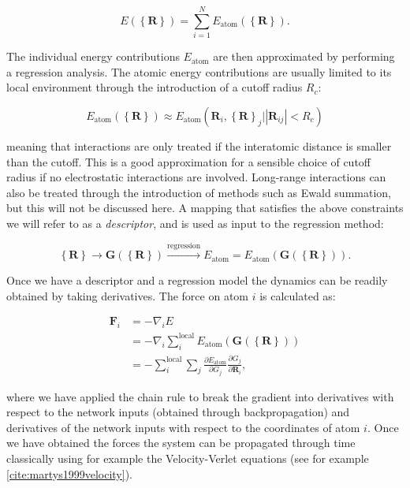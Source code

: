 \begin{equation}
 E(\left\{\bm{R}\right\}) = \sum_{i=1}^N E_{\text{atom}}
 (\left\{\bm{R}\right\}) . 
\end{equation}

The individual energy contributions $E_{\text{atom}}$
are then approximated by performing a regression analysis.
The atomic energy contributions are usually limited to its
local environment through the introduction of a cutoff radius $R_c$:

\begin{equation}
 E_{\text{atom}} (\left\{\bm{R}\right\}) \approx
    E_{\text{atom}} (\bm{R}_i, \left\{\bm{R}\right\}_j 
    | \left| \bm{R}_{ij} \right|
    < R_c) 
\end{equation}

meaning that interactions are only treated if the interatomic distance
is smaller than the cutoff. This is a good approximation for a sensible
choice of cutoff radius if no electrostatic interactions are involved.
Long-range interactions can also be treated through
the introduction of methods such as Ewald summation, but this will
not be discussed here.
A mapping that satisfies the above constraints we will refer to
as a \textit{descriptor}, and is used as input to the regression method:

\begin{equation}
    \left\{\bm{R}\right\} \rightarrow \bm{G}(\left\{\bm{R}\right\}) 
    \overset{\text{regression}}
    {\longrightarrow} E_{\text{atom}} =
    E_{\text{atom}}(\bm{G}(\left\{\bm{R}\right\})). 
\end{equation}

Once we have a descriptor and a regression model the dynamics
can be readily obtained by taking derivatives. The force on atom
$i$ is calculated as:

\begin{equation}
\begin{split}
    \bm{F}_i &= -\nabla_i E \\
    &= -\nabla_i \sum_i^{\text{local}}
    E_{\text{atom}}(\bm{G}(\left\{\bm{R}\right\})) \\
    &= -\sum_i^{\text{local}} \sum_j \frac{\partial E_{\text{atom}}}
    {\partial G_j} \frac{\partial G_j}{\partial \bm{R}_i} ,
\end{split}
\end{equation}

where we have applied the chain rule to break the gradient
into derivatives with respect to the network inputs (obtained through
backpropagation) and derivatives of the network inputs with
respect to the coordinates of atom $i$.
Once we have obtained the forces the system can be propagated through time
classically using for example the Velocity-Verlet equations (see for
example \ref{cite:martys1999velocity}).


